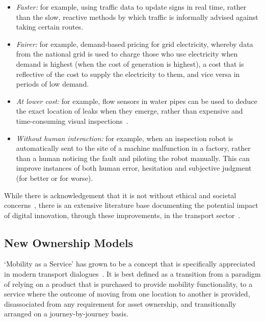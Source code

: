 \documentclass[journal]{IEEEtran}
\begin{document}
\begin{itemize}
\item {\emph{Faster:}} for example, using traffic data to update
  signs in real time, rather than the slow, reactive methods by which
  traffic is informally advised against taking certain routes.
\item {\emph{Fairer:}} for example, demand-based pricing for grid
  electricity, whereby data from the national grid is used to charge
  those who use electricity when demand is highest (when the cost of
  generation is highest), a cost that is reflective of the cost to
  supply the electricity to them, and vice versa in periods of low
  demand.
\item {\emph{At lower cost:}} for example, flow sensors in water
  pipes can be used to deduce the exact location of leaks when they
  emerge, rather than expensive and time-consuming visual
  inspections~\cite{cosgrave-et-al:2014}.
\item {\emph{Without human interaction:}} for example, when an
  inspection robot is automatically sent to the site of a machine
  malfunction in a factory, rather than a human noticing the fault and
  piloting the robot manually. This can improve instances of both
  human error, hesitation and subjective judgment (for better or for
  worse).
\end{itemize}

While there is acknowledgement that it is not without ethical and
societal concerns~\cite{bimber:1990}, there is an extensive literature
base documenting the potential impact of digital innovation, through
these improvements, in the transport sector~\cite{enoch:2015}.


\subsection{New Ownership Models}

`Mobility as a Service' has grown to be a concept that is specifically
appreciated in modern transport dialogues~\cite{tscatapult:2016}. It
is best defined as a transition from a paradigm of relying on a
product that is purchased to provide mobility functionality, to a
service where the outcome of moving from one location to another is
provided, disassociated from any requirement for asset ownership, and
transitionally arranged on a journey-by-journey basis.
\end{document}
